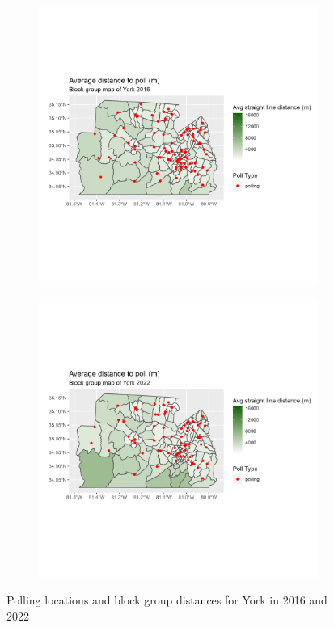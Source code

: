 \documentclass[11pt]{article}
\theoremstyle{remark}
\theoremstyle{definition}
\begin{document}
\begin{figure}
	\begin{subfigure}{.5\textwidth}
		\centering
		\includegraphics[width=\linewidth]{result_analysis/York_County_SC_original_configs/distance_map_York_config_original_2016_polls.png}
		\label{sfig:York_2016_bg_dist}
	\end{subfigure} 
	\begin{subfigure}{.5\textwidth}
		\centering
		\includegraphics[width=\linewidth]{result_analysis/York_County_SC_original_configs/distance_map_York_config_original_2022_polls.png}
		\label{sfig:York_2022_bg_dist}
	\end{subfigure}
	\caption{Polling locations and block group distances for York in 2016 and 2022}
	\label{fig:York distance maps}
\end{figure}
\end{document}
